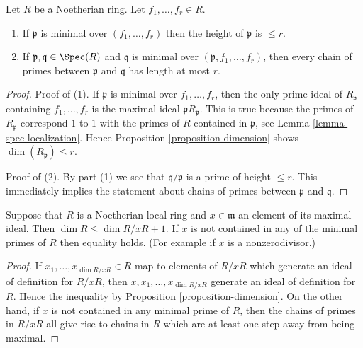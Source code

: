 \begin{lemma}
\label{lemma-minimal-over-r}
Let $R$ be a Noetherian ring. Let $f_1, \ldots, f_r \in R$.
\begin{enumerate}
\item If $\mathfrak p$ is minimal over $(f_1, \ldots, f_r)$
then the height of $\mathfrak p$ is $\leq r$.
\item If $\mathfrak p, \mathfrak q \in \Spec(R)$ and
$\mathfrak q$ is minimal over $(\mathfrak p, f_1, \ldots, f_r)$,
then every chain of primes between $\mathfrak p$ and $\mathfrak q$
has length at most $r$.
\end{enumerate}
\end{lemma}

\begin{proof}
Proof of (1). If $\mathfrak p$ is minimal over $f_1, \ldots, f_r$,
then the only prime ideal of $R_\mathfrak p$ containing $f_1, \ldots, f_r$
is the maximal ideal $\mathfrak p R_\mathfrak p$. This is true because
the primes of $R_\mathfrak p$ correspond $1$-to-$1$ with the primes of
$R$ contained in $\mathfrak p$, see Lemma \ref{lemma-spec-localization}.
Hence Proposition \ref{proposition-dimension} shows
$\dim(R_\mathfrak p) \leq r$.

\medskip\noindent
Proof of (2). By part (1) we see that $\mathfrak q/\mathfrak p$
is a prime of height $\leq r$. This immediately
implies the statement about chains of primes between $\mathfrak p$
and $\mathfrak q$.
\end{proof}

\begin{lemma}
\label{lemma-one-equation}
Suppose that $R$ is a Noetherian local ring and $x\in \mathfrak m$ an
element of its maximal ideal. Then $\dim R \leq \dim R/xR + 1$.
If $x$ is not contained in any of the minimal primes of $R$
then equality holds. (For example if $x$ is a nonzerodivisor.)
\end{lemma}

\begin{proof}
If $x_1, \ldots, x_{\dim R/xR} \in R$ map to elements of $R/xR$ which
generate an ideal of definition for $R/xR$, then $x, x_1, \ldots,
x_{\dim R/xR}$ generate an ideal of definition for $R$. Hence
the inequality by Proposition \ref{proposition-dimension}.
On the other hand, if $x$ is not contained in any minimal
prime of $R$, then the chains of primes in $R/xR$ all give
rise to chains in $R$ which are at least one step away
from being maximal.
\end{proof}

